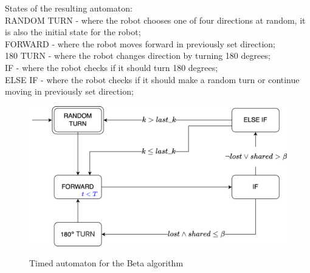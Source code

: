 States of the resulting automaton:\\
RANDOM TURN - where the robot chooses one of four directions at random, it is also the initial state for the robot;\\
FORWARD - where the robot moves forward in previously set direction;\\
180 TURN - where the robot changes direction by turning 180 degrees;\\
IF - where the robot checks if it should turn 180 degrees; \\
ELSE IF - where the robot checks if it should make a random turn or continue moving in previously set direction;\\


\begin{figure}[H]
\caption{Timed automaton for the Beta algorithm}
\includegraphics[width=\textwidth]{images/beta.png}
\label{fig:automaton}
\end{figure}
